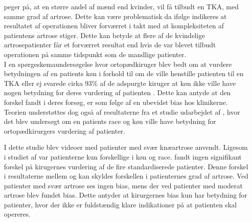  peger på, at en større andel af mænd end kvinder, vil få tilbudt en TKA, med samme grad af artrose. Dette kan være problematisk da ifølge  indikeres at resultatet af operationen bliver forværret i takt med at kompleksiteten af patientens artrose stiger. \citep{fortin1999} Dette kan betyde at flere af de kvindelige artrosepatienter får et forværret resultat end hvis de var blevet tilbudt operationen på samme tidspunkt som de mandlige patienter. \citep{borkhoff2008} \\




I en spørgeskemaundersøgelse hvor ortopædkiruger blev bedt om at vurdere betydningen af en patients køn i forhold til om de ville henstille patienten til en TKA eller ej svarede cirka 93\% af de adspurgte kiruger at køn ikke ville have nogen betydning for deres vurdering af patienten \citep{wright1995}.  Dette kan antyde at den forskel  fandt i deres forsøg, er som følge af en ubevidst bias hos klinikerne. Teorien understøttes dog også af resultaterne fra et studie udarbejdet af \cite{dy2014}, hvor det blev undersøgt om en patients race og køn ville have betydning for ortopædkirurgers vurdering af patienter.

I dette studie blev videoer med patienter med svær knæartrose anvendt. Ligesom i studiet af  var patienterne kun forskellige i køn og race.  fandt ingen signifikant forskel på kirugernes vurdering af de fire standardiserede patienter. Denne forskel i resultaterne mellem \cite{borkhoff2008} og \cite{dy2014} kan skyldes forskellen i patienternes grad af artrose. Ved patienter med svær artrose ses ingen bias, mens der ved patienter med moderat artrose blev fundet bias. Dette antyder at kirurgernes bias kun har betydning for patienter, hvor der ikke er fuldstændig klare indikationer på at patienten skal opereres. 


